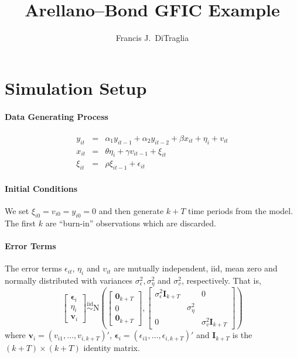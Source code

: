 \documentclass[12pt]{article}
\title{Arellano--Bond GFIC Example}
\author{Francis J.\ DiTraglia}
\begin{document}
\maketitle

\section{Simulation Setup}

\paragraph{Data Generating Process} 
\begin{eqnarray*}
y_{it} &=& \alpha_1 y_{it-1} + \alpha_2 y_{it-2} +\beta   x_{it} + \eta_i + v_{it}\\
x_{it} &=& \theta \eta_i + \gamma v_{it-1} + \xi_{it}\\
\xi_{it} &=& \rho \xi_{it-1} + \epsilon_{it}
\end{eqnarray*}

\paragraph{Initial Conditions} We set $\xi_{i0} =v_{i0}= y_{i0} = 0$ and then generate $k + T$ time periods from the model. The first $k$ are ``burn-in'' observations which are discarded. 


\paragraph{Error Terms}
The error terms $\epsilon_{it}$, $\eta_i$ and $v_{it}$ are mutually independent, iid, mean zero and normally distributed with variances $\sigma_\epsilon^2, \sigma_\eta^2$ and $\sigma_v^2$, respectively. That is,
  $$\left[ \begin{array}{c} \boldsymbol{\epsilon}_i \\ \eta_i \\ \boldsymbol{v}_i \end{array} \right] \overset{\mbox{iid}}{\sim} \mbox{N}\left(
  \left[ \begin{array}{l}
    \mathbf{0}_{k+T}\\
    0\\
    \mathbf{0}_{k+T}
  \end{array}\right], 
  \left[ \begin{array}{ccc}
    \sigma_\epsilon^2 \mathbf{I}_{k+T}&&0 \\
    &\sigma_\eta^2& \\
    0&&\sigma_v^2 \mathbf{I}_{k+T}
  \end{array}\right]
  \right)$$
where $\mathbf{v}_i = (v_{i1}, \hdots, v_{i,k+T})'$, $\boldsymbol{\epsilon}_i = (\epsilon_{i1}, \hdots, \epsilon_{i,k+T})'$ and $\mathbf{I}_{k+T}$ is the $(k+T)\times(k+T)$ identity matrix.
\end{document}

